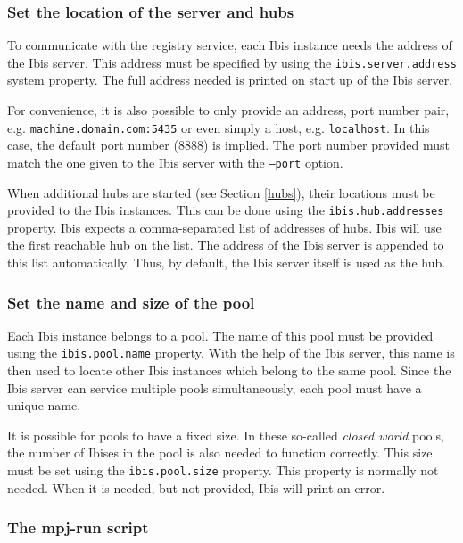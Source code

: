 \documentclass[a4paper,10pt]{article}
\begin{document}
\subsubsection{Set the location of the server and hubs}

To communicate with the registry service, each Ibis instance needs the address
of the Ibis server. This address must be specified by using the
\texttt{ibis.server.address} system property. The full address needed is
printed on start up of the Ibis server.

For convenience, it is also possible to only provide an address, port number
pair, e.g. \texttt{machine.domain.com:5435} or even simply a host, e.g.
\texttt{localhost}. In this case, the default port number (8888) is implied.
The port number provided must match the one given to the Ibis server
with the \texttt{--port} option.

When additional hubs are started (see Section \ref{hubs}), their locations
must be provided to the Ibis instances. This can be done using
the \texttt{ibis.hub.addresses} property. Ibis expects a comma-separated
list of addresses of hubs. Ibis will use the first reachable hub on the
list. The address of the Ibis server is appended to this list
automatically. Thus, by default, the Ibis server itself is used as the
hub.

\subsubsection{Set the name and size of the pool}

Each Ibis instance belongs to a pool. The name of this pool must be provided
using the \texttt{ibis.pool.name} property. With the help of the Ibis server,
this name is then used to locate other Ibis instances which belong to the
same pool. Since the Ibis server can service multiple pools simultaneously,
each pool must have a unique name.

It is possible for pools to have a fixed size. In these so-called \emph{closed
world} pools, the number of Ibises in the pool is also needed to function
correctly. This size must be set using the \texttt{ibis.pool.size} property.
This property is normally not needed. When it is needed, but not provided, Ibis
will print an error. 

\subsubsection{The mpj-run script}
\end{document}
